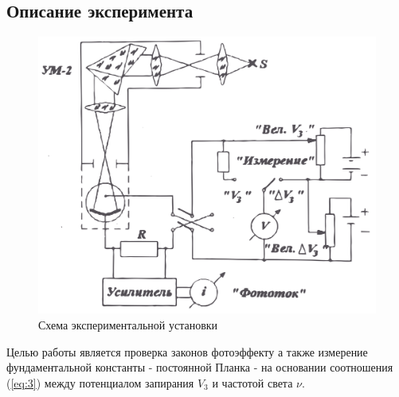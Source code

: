 \subsection{Описание эксперимента}
\begin{figure}[h!]
	\centering
	\includegraphics[width=\linewidth]{fig/fig2.png}
	\caption{Схема экспериментальной установки}
	\label{fig:2}
\end{figure}

Целью работы является проверка законов фотоэффекту а также измерение фундаментальной константы - постоянной Планка - на основании соотношения (\ref{eq:3}) между потенциалом запирания $V_{3}$ и частотой света $\nu$.

